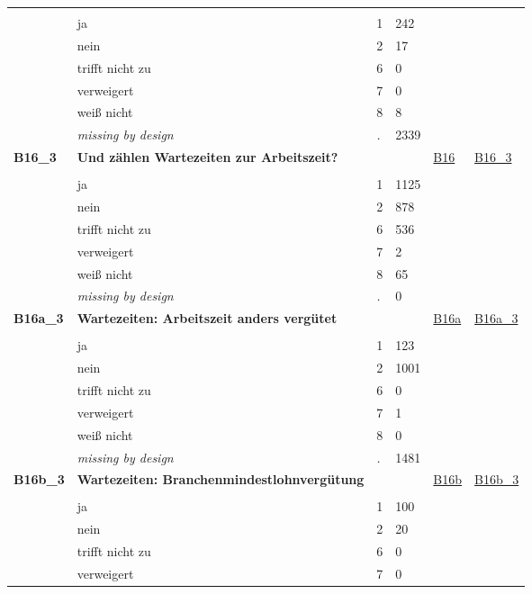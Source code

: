 \begin{longtable}{| L{2.45cm} | L{6cm} | C{1.5cm} | R{1cm} | C{2.25cm} | C{2.25cm} |}
   &  &  &  &  &  \\ 
   & ja & 1 & 242 &  &  \\ 
   & nein & 2 & 17 &  &  \\ 
   & trifft nicht zu & 6 & 0 &  &  \\ 
   & verweigert & 7 & 0 &  &  \\ 
   & weiß nicht & 8 & 8 &  &  \\ 
   & \textit{missing by design} & \textit{.} & 2339 &  &  \\ 
   \midrule
\textbf{B16\_3}\label{var:B16:3} & \textbf{Und zählen Wartezeiten zur Arbeitszeit?} &  &  & \hyperref[B16]{B16} & \hyperref[var:suf:B16:3]{B16\_3} \\ 
   &  &  &  &  &  \\ 
   & ja & 1 & 1125 &  &  \\ 
   & nein & 2 & 878 &  &  \\ 
   & trifft nicht zu & 6 & 536 &  &  \\ 
   & verweigert & 7 & 2 &  &  \\ 
   & weiß nicht & 8 & 65 &  &  \\ 
   & \textit{missing by design} & \textit{.} & 0 &  &  \\ 
   \midrule
\textbf{B16a\_3}\label{var:B16a:3} & \textbf{Wartezeiten: Arbeitszeit anders vergütet} &  &  & \hyperref[B16a]{B16a} & \hyperref[var:suf:B16a:3]{B16a\_3} \\ 
   &  &  &  &  &  \\ 
   & ja & 1 & 123 &  &  \\ 
   & nein & 2 & 1001 &  &  \\ 
   & trifft nicht zu & 6 & 0 &  &  \\ 
   & verweigert & 7 & 1 &  &  \\ 
   & weiß nicht & 8 & 0 &  &  \\ 
   & \textit{missing by design} & \textit{.} & 1481 &  &  \\ 
   \midrule
\textbf{B16b\_3}\label{var:B16b:3} & \textbf{Wartezeiten: Branchenmindestlohnvergütung} &  &  & \hyperref[B16b]{B16b} & \hyperref[var:suf:B16b:3]{B16b\_3} \\ 
   &  &  &  &  &  \\ 
   & ja & 1 & 100 &  &  \\ 
   & nein & 2 & 20 &  &  \\ 
   & trifft nicht zu & 6 & 0 &  &  \\ 
   & verweigert & 7 & 0 &  &  \\ 

\end{longtable}
